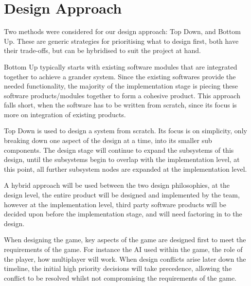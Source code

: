 \section{Design Approach}


Two methods were considered for our design approach: Top Down, and Bottom Up.
These are generic strategies for prioritising what to design first, both have their trade-offs, but can be hybridised to suit the project at hand.

Bottom Up typically starts with existing software modules that are integrated together to achieve a grander system.
Since the existing softwares provide the needed functionality, the majority of the implementation stage is piecing these software products/modules together to form a cohesive product.
This approach falls short, when the software has to be written from scratch, since its focus is more on integration of existing products.

Top Down is used to design a system from scratch.
Its focus is on simplicity, only breaking down one aspect of the design at a time, into its smaller sub components.
The design stage will continue to expand the subsystems of this design, until the subsystems begin to overlap with the implementation level, at this point, all further subsystem nodes are expanded at the implementation level.

A hybrid approach will be used between the two design philosophies, at the design level, the  entire product will be designed and implemented by the team, however at the implementation level, third party software products will be decided upon before the implementation stage, and will need factoring in to the design.

When designing the game, key aspects of the game are designed first to meet the requirements of the game. For instance the AI used within the game, the role of the player, how multiplayer will work.
When design conflicts arise later down the timeline, the initial high priority decisions will take precedence, allowing the conflict to be resolved whilst not compromising the requirements of the game.




